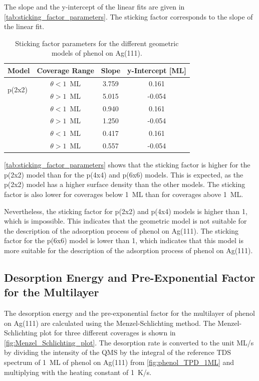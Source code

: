 \documentclass[fontsize=11pt,reqno,a4paper,oneside]{scrartcl}
\begin{document}
The slope and the y-intercept of the linear fits are given in \autoref{tab:sticking_factor_parameters}. The sticking factor corresponds to the slope of the linear fit. 
\begin{table}[htbp]
    \centering
    \caption{Sticking factor parameters for the different geometric models of phenol on Ag(111).}
    \begin{tabular}{@{}lccc@{}}
        \toprule
        \multicolumn{1}{c}{Model} & Coverage Range & Slope & y-Intercept [ML] \\
        \midrule
        \multirow{2}{*}{p(2x2)} & $\theta < 1$~ML & 3.759 & 0.161 \\
                                & $\theta > 1$~ML & 5.015 & -0.054 \\ 
        \addlinespace[0.5em]
        \multirow{2}{*}{p(4x4)} & $\theta < 1$~ML & 0.940 & 0.161 \\
                                & $\theta > 1$~ML & 1.250 & -0.054 \\
        \addlinespace[0.5em]
        \multirow{2}{*}{p(6x6)} & $\theta < 1$~ML & 0.417 & 0.161 \\
                                & $\theta > 1$~ML & 0.557 & -0.054 \\
        \bottomrule
    \end{tabular}
    \label{tab:sticking_factor_parameters}
\end{table}

\autoref{tab:sticking_factor_parameters} shows that the sticking factor is higher for the p(2x2) model than for the p(4x4) and p(6x6) models. This is expected, as the p(2x2) model has a higher surface density than the other models. The sticking factor is also lower for coverages below 1~ML than for coverages above 1~ML.

Nevertheless, the sticking factor for p(2x2) and p(4x4) models is higher than 1, which is impossible. This indicates that the geometric model is not suitable for the description of the adsorption process of phenol on Ag(111). The sticking factor for the p(6x6) model is lower than 1, which indicates that this model is more suitable for the description of the adsorption process of phenol on Ag(111).

\clearpage
\subsection{Desorption Energy and Pre-Exponential Factor for the Multilayer}

The desorption energy and the pre-exponential factor for the multilayer of phenol on Ag(111) are calculated using the Menzel-Schlichting method.\autocite{Schlichting1992} The Menzel-Schlichting plot for three different coverages is shown in \autoref{fig:Menzel_Schlichting_plot}. The desorption rate is converted to the unit ML/s by dividing the intensity of the \ac{QMS} by the integral of the reference \ac{TDS} spectrum of 1~ML of phenol on Ag(111) from \autoref{fig:phenol_TPD_1ML} and multiplying with the heating constant of 1~K/s.
\end{document}
